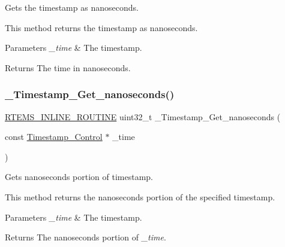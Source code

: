 Gets the timestamp as nanoseconds. 

This method returns the timestamp as nanoseconds.


\begin{DoxyParams}{Parameters}
{\em \+\_\+time} & The timestamp.\\
\hline
\end{DoxyParams}
\begin{DoxyReturn}{Returns}
The time in nanoseconds. 
\end{DoxyReturn}
\mbox{\label{group__SuperCoreTimeStamp_ga3675c10bc67f416f801467ba3d73dcb7}} 
\subsubsection{\texorpdfstring{\_Timestamp\_Get\_nanoseconds()}{\_Timestamp\_Get\_nanoseconds()}}
{\footnotesize\ttfamily \mbox{\hyperlink{group__RTEMSScoreBaseDefs_gac216239df231d5dbd15e3520b0b9313f}{R\+T\+E\+M\+S\+\_\+\+I\+N\+L\+I\+N\+E\+\_\+\+R\+O\+U\+T\+I\+NE}} uint32\+\_\+t \+\_\+\+Timestamp\+\_\+\+Get\+\_\+nanoseconds (\begin{DoxyParamCaption}\item[{const \mbox{\hyperlink{group__SuperCoreTimeStamp_ga8508036506d5211c98844c88045e2410}{Timestamp\+\_\+\+Control}} $\ast$}]{\+\_\+time }\end{DoxyParamCaption})}



Gets nanoseconds portion of timestamp. 

This method returns the nanoseconds portion of the specified timestamp.


\begin{DoxyParams}{Parameters}
{\em \+\_\+time} & The timestamp.\\
\hline
\end{DoxyParams}
\begin{DoxyReturn}{Returns}
The nanoseconds portion of {\itshape \+\_\+time}. 
\end{DoxyReturn}
\mbox{\label{group__SuperCoreTimeStamp_gada24d1e501df67120a06af4f5c40e4be}} 
